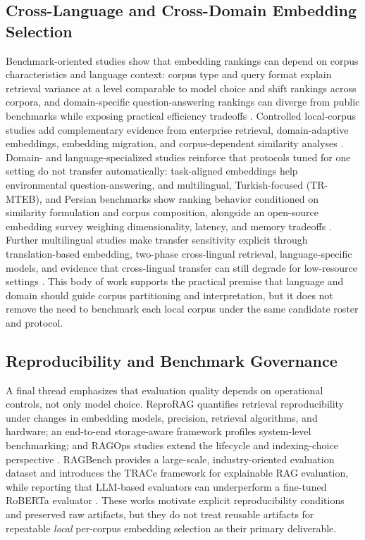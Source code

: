 \subsection{Cross-Language and Cross-Domain Embedding Selection}\label{rw-shift}

Benchmark-oriented studies show that embedding rankings can depend on corpus characteristics and language context: corpus type and query format explain retrieval variance at a level comparable to model choice and shift rankings across corpora, and domain-specific question-answering rankings can diverge from public benchmarks while exposing practical efficiency tradeoffs \citep{Mikkelsen_2026, Antal_2025}. Controlled local-corpus studies add complementary evidence from enterprise retrieval, domain-adaptive embeddings, embedding migration, and corpus-dependent similarity analyses \citep{cohen2025wixqa, luo2025domain, yoon2025embedding, dvorackova2025analyzing}. Domain- and language-specialized studies reinforce that protocols tuned for one setting do not transfer automatically: task-aligned embeddings help environmental question-answering, and multilingual, Turkish-focused (TR-MTEB), and Persian benchmarks show ranking behavior conditioned on similarity formulation and corpus composition, alongside an open-source embedding survey weighing dimensionality, latency, and memory tradeoffs \citep{Sajja_2025, Baysan_2025, Kalantari_2024, Abimbola_2026}. Further multilingual studies make transfer sensitivity explicit through translation-based embedding, two-phase cross-lingual retrieval, language-specific models, and evidence that cross-lingual transfer can still degrade for low-resource settings \citep{Iscan_2024, nezhad2025cross, mekonnen2025optimized, Gutu_2025, Iana_2026}. This body of work supports the practical premise that language and domain should guide corpus partitioning and interpretation, but it does not remove the need to benchmark each local corpus under the same candidate roster and protocol.

\subsection{Reproducibility and Benchmark Governance}\label{rw-repro}

A final thread emphasizes that evaluation quality depends on operational controls, not only model choice. ReproRAG quantifies retrieval reproducibility under changes in embedding models, precision, retrieval algorithms, and hardware; an end-to-end storage-aware framework profiles system-level benchmarking; and RAGOps studies extend the lifecycle and indexing-choice perspective \citep{wang2025reproducibility, xu2025end, xu2025ragops}. RAGBench provides a large-scale, industry-oriented evaluation dataset and introduces the TRACe framework for explainable RAG evaluation, while reporting that LLM-based evaluators can underperform a fine-tuned RoBERTa evaluator \citep{friel2024ragbench}. These works motivate explicit reproducibility conditions and preserved raw artifacts, but they do not treat reusable artifacts for repeatable \emph{local} per-corpus embedding selection as their primary deliverable.

